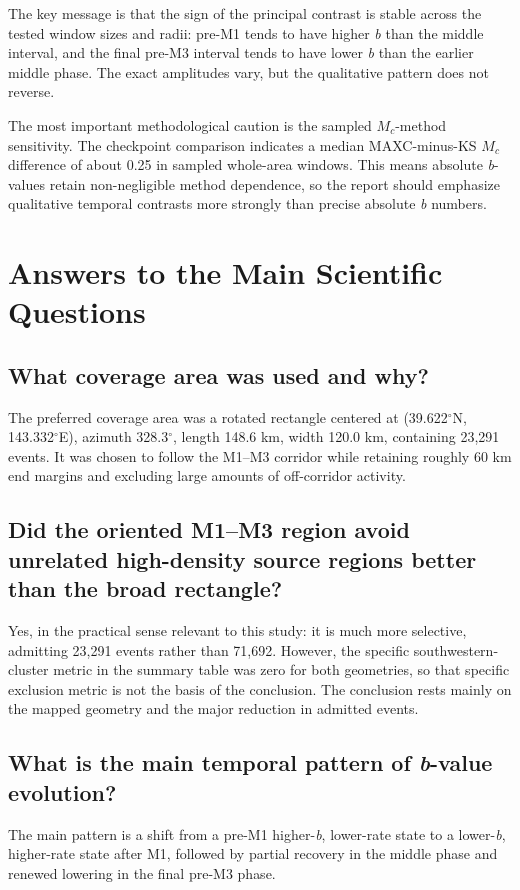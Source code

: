 \documentclass[11pt]{article}
\begin{document}
The key message is that the sign of the principal contrast is stable across the tested window sizes and radii: pre-M1 tends to have higher \textit{b} than the middle interval, and the final pre-M3 interval tends to have lower \textit{b} than the earlier middle phase. The exact amplitudes vary, but the qualitative pattern does not reverse.

The most important methodological caution is the sampled $M_c$-method sensitivity. The checkpoint comparison indicates a median MAXC-minus-KS $M_c$ difference of about 0.25 in sampled whole-area windows. This means absolute \textit{b}-values retain non-negligible method dependence, so the report should emphasize qualitative temporal contrasts more strongly than precise absolute \textit{b} numbers.

\section{Answers to the Main Scientific Questions}
\subsection*{What coverage area was used and why?}
The preferred coverage area was a rotated rectangle centered at (39.622$^{\circ}$N, 143.332$^{\circ}$E), azimuth 328.3$^{\circ}$, length 148.6 km, width 120.0 km, containing 23,291 events. It was chosen to follow the M1--M3 corridor while retaining roughly 60 km end margins and excluding large amounts of off-corridor activity.

\subsection*{Did the oriented M1--M3 region avoid unrelated high-density source regions better than the broad rectangle?}
Yes, in the practical sense relevant to this study: it is much more selective, admitting 23,291 events rather than 71,692. However, the specific southwestern-cluster metric in the summary table was zero for both geometries, so that specific exclusion metric is not the basis of the conclusion. The conclusion rests mainly on the mapped geometry and the major reduction in admitted events.

\subsection*{What is the main temporal pattern of \textit{b}-value evolution?}
The main pattern is a shift from a pre-M1 higher-\textit{b}, lower-rate state to a lower-\textit{b}, higher-rate state after M1, followed by partial recovery in the middle phase and renewed lowering in the final pre-M3 phase.
\end{document}
